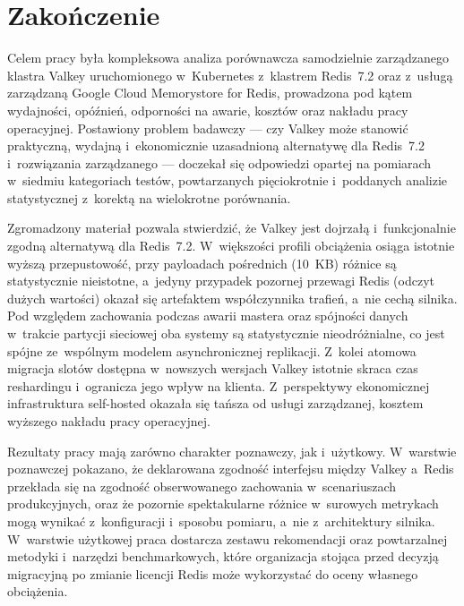 \chapter{Zakończenie}\label{ch:zakonczenie}

Celem pracy była kompleksowa analiza porównawcza samodzielnie zarządzanego klastra Valkey uruchomionego w~Kubernetes z~klastrem Redis~7.2 oraz z~usługą zarządzaną Google Cloud Memorystore for Redis, prowadzona pod kątem wydajności, opóźnień, odporności na awarie, kosztów oraz nakładu pracy operacyjnej. Postawiony problem badawczy --- czy Valkey może stanowić praktyczną, wydajną i~ekonomicznie uzasadnioną alternatywę dla Redis~7.2 i~rozwiązania zarządzanego --- doczekał się odpowiedzi opartej na pomiarach w~siedmiu kategoriach testów, powtarzanych pięciokrotnie i~poddanych analizie statystycznej z~korektą na wielokrotne porównania.

Zgromadzony materiał pozwala stwierdzić, że Valkey jest dojrzałą i~funkcjonalnie zgodną alternatywą dla Redis~7.2. W~większości profili obciążenia osiąga istotnie wyższą przepustowość, przy payloadach pośrednich (10~KB) różnice są statystycznie nieistotne, a~jedyny przypadek pozornej przewagi Redis (odczyt dużych wartości) okazał się artefaktem współczynnika trafień, a~nie cechą silnika. Pod względem zachowania podczas awarii mastera oraz spójności danych w~trakcie partycji sieciowej oba systemy są statystycznie nieodróżnialne, co jest spójne ze~wspólnym modelem asynchronicznej replikacji. Z~kolei atomowa migracja slotów dostępna w~nowszych wersjach Valkey istotnie skraca czas reshardingu i~ogranicza jego wpływ na klienta. Z~perspektywy ekonomicznej infrastruktura self-hosted okazała się tańsza od usługi zarządzanej, kosztem wyższego nakładu pracy operacyjnej.

Rezultaty pracy mają zarówno charakter poznawczy, jak i~użytkowy. W~warstwie poznawczej pokazano, że deklarowana zgodność interfejsu między Valkey a~Redis przekłada się na zgodność obserwowanego zachowania w~scenariuszach produkcyjnych, oraz że pozornie spektakularne różnice w~surowych metrykach mogą wynikać z~konfiguracji i~sposobu pomiaru, a~nie z~architektury silnika. W~warstwie użytkowej praca dostarcza zestawu rekomendacji oraz powtarzalnej metodyki i~narzędzi benchmarkowych, które organizacja stojąca przed decyzją migracyjną po zmianie licencji Redis może wykorzystać do oceny własnego obciążenia.

